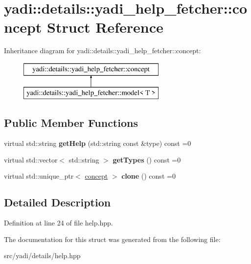 \hypertarget{structyadi_1_1details_1_1yadi__help__fetcher_1_1concept}{}\section{yadi\+:\+:details\+:\+:yadi\+\_\+help\+\_\+fetcher\+:\+:concept Struct Reference}
\label{structyadi_1_1details_1_1yadi__help__fetcher_1_1concept}
Inheritance diagram for yadi\+:\+:details\+:\+:yadi\+\_\+help\+\_\+fetcher\+:\+:concept\+:\begin{figure}[H]
\begin{center}
\leavevmode
\includegraphics[height=2.000000cm]{structyadi_1_1details_1_1yadi__help__fetcher_1_1concept}
\end{center}
\end{figure}
\subsection*{Public Member Functions}
\begin{DoxyCompactItemize}
\item 
\mbox{\label{structyadi_1_1details_1_1yadi__help__fetcher_1_1concept_ae1dab24d74d79eb7b385509d5628b402}} 
virtual std\+::string {\bfseries get\+Help} (std\+::string const \&type) const =0
\item 
\mbox{\label{structyadi_1_1details_1_1yadi__help__fetcher_1_1concept_ac61809b7604489e5176a2d0f8ad3e776}} 
virtual std\+::vector$<$ std\+::string $>$ {\bfseries get\+Types} () const =0
\item 
\mbox{\label{structyadi_1_1details_1_1yadi__help__fetcher_1_1concept_a2d55ab2f5201a53381743ffc59119057}} 
virtual std\+::unique\+\_\+ptr$<$ \hyperlink{structyadi_1_1details_1_1yadi__help__fetcher_1_1concept}{concept} $>$ {\bfseries clone} () const =0
\end{DoxyCompactItemize}


\subsection{Detailed Description}


Definition at line 24 of file help.\+hpp.



The documentation for this struct was generated from the following file\+:\begin{DoxyCompactItemize}
\item 
src/yadi/details/help.\+hpp\end{DoxyCompactItemize}
